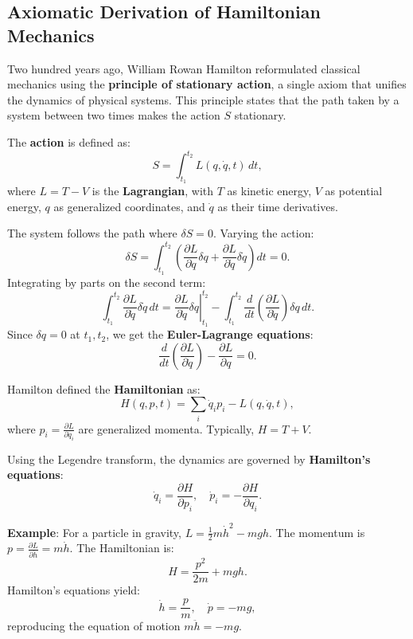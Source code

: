 \subsection{Axiomatic Derivation of Hamiltonian Mechanics}
Two hundred years ago, William Rowan Hamilton reformulated classical mechanics using the \textbf{principle of stationary action}, a single axiom that unifies the dynamics of physical systems. This principle states that the path taken by a system between two times makes the action \( S \) stationary.

The \textbf{action} is defined as:
\[
S = \int_{t_1}^{t_2} L(q, \dot{q}, t) \, dt,
\]
where \( L = T - V \) is the \textbf{Lagrangian}, with \( T \) as kinetic energy, \( V \) as potential energy, \( q \) as generalized coordinates, and \( \dot{q} \) as their time derivatives.

The system follows the path where \( \delta S = 0 \). Varying the action:
\[
\delta S = \int_{t_1}^{t_2} \left( \frac{\partial L}{\partial q} \delta q + \frac{\partial L}{\partial \dot{q}} \delta \dot{q} \right) dt = 0.
\]
Integrating by parts on the second term:
\[
\int_{t_1}^{t_2} \frac{\partial L}{\partial \dot{q}} \delta \dot{q} \, dt = \left. \frac{\partial L}{\partial \dot{q}} \delta q \right|_{t_1}^{t_2} - \int_{t_1}^{t_2} \frac{d}{dt} \left( \frac{\partial L}{\partial \dot{q}} \right) \delta q \, dt.
\]
Since \( \delta q = 0 \) at \( t_1, t_2 \), we get the \textbf{Euler-Lagrange equations}:
\[
\frac{d}{dt} \left( \frac{\partial L}{\partial \dot{q}} \right) - \frac{\partial L}{\partial q} = 0.
\]

Hamilton defined the \textbf{Hamiltonian} as:
\[
H(q, p, t) = \sum_i \dot{q}_i p_i - L(q, \dot{q}, t),
\]
where \( p_i = \frac{\partial L}{\partial \dot{q}_i} \) are generalized momenta. Typically, \( H = T + V \).

Using the Legendre transform, the dynamics are governed by \textbf{Hamilton's equations}:
\[
\dot{q}_i = \frac{\partial H}{\partial p_i}, \quad \dot{p}_i = -\frac{\partial H}{\partial q_i}.
\]

\textbf{Example}: For a particle in gravity, \( L = \frac{1}{2} m \dot{h}^2 - mgh \). The momentum is \( p = \frac{\partial L}{\partial \dot{h}} = m \dot{h} \). The Hamiltonian is:
\[
H = \frac{p^2}{2m} + mgh.
\]
Hamilton's equations yield:
\[
\dot{h} = \frac{p}{m}, \quad \dot{p} = -mg,
\]
reproducing the equation of motion \( m \ddot{h} = -mg \).

